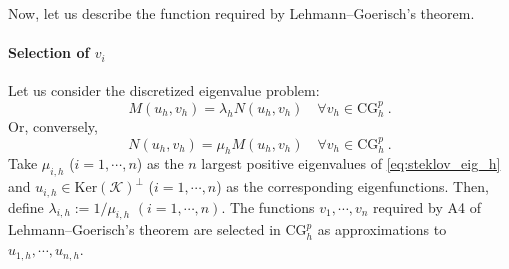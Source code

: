 \documentclass[a4,11pt]{article}
\numberwithin{equation}{section}
\begin{document}
\medskip

Now, let us describe the function  required by  Lehmann--Goerisch's theorem.

\paragraph{Selection of $v_i$}
Let us consider the discretized eigenvalue problem: 
\begin{equation}
M(u_h, v_h) = \lambda_{h} N(u_h, v_h)\quad \forall v_h \in \text{CG}^p_h~.
\end{equation}
Or, conversely, 
\begin{equation}	\label{eq:steklov_eig_h}
N(u_h, v_h) = \mu_{h} M(u_h, v_h)\quad \forall v_h \in \text{CG}^p_h~.
\end{equation}
Take $\mu_{i,h}$ ($i=1,\cdots,n$) as the $n$ largest positive eigenvalues of \eqref{eq:steklov_eig_h} and $u_{i,h}\in \mbox{Ker}(\mathcal{K})^\perp$  ($i=1,\cdots,n$) as the corresponding eigenfunctions. Then, define $\lambda_{i,h}:=1/\mu_{i,h}$ $(i=1,\cdots,n)$.
The functions $v_1, \cdots, v_n$ required by A4 of Lehmann--Goerisch's theorem are selected  in $\text{CG}^p_h$ as approximations  to $u_{1,h}, \cdots, u_{n,h}$. 

\medskip
\end{document}
